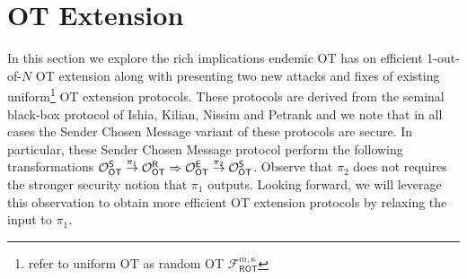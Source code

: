 

\newcommand{\rr}{\ensuremath{\boldsymbol{r}}}
\renewcommand{\tt}{\ensuremath{\boldsymbol{t}}}
\newcommand{\ww}{\ensuremath{\boldsymbol{w}}}
\newcommand{\cc}{\ensuremath{\boldsymbol{c}}}
\newcommand{\uu}{\ensuremath{\boldsymbol{u}}}
\newcommand{\qq}{\ensuremath{\boldsymbol{q}}}
\newcommand{\bb}{\ensuremath{\boldsymbol{b}}}
\newcommand{\vv}{\ensuremath{\boldsymbol{v}}}
\newcommand{\nc}{\ensuremath{{n_\mathcal{C}}}}
\newcommand{\kc}{\ensuremath{{k_\mathcal{C}}}}
\newcommand{\dc}{\ensuremath{{d_\mathcal{C}}}}

\section{OT Extension}


In this section we explore the rich implications endemic OT has on efficient 1-out-of-$N$ OT extension along with presenting two new attacks and fixes of existing uniform\footnote{\cite{KOS15, OOS16} refer to uniform OT as random OT $\mathcal{F}^{m,\kappa}_{\textsf{ROT}}$} OT extension protocols\cite{KOS15, OOS16}. These protocols are derived from the seminal black-box protocol of Ishia, Kilian, Nissim and Petrank\cite{IKNP03} and we note that in all cases the Sender Chosen Message variant of these protocols\cite{IKNP03, KOS15, OOS16} are secure. In particular, these Sender Chosen Message protocol perform the following transformations $\mathcal{O}_{\mathsf{OT}}^\mathsf{S}\overset{\pi_1}{\rightarrow} \mathcal{O}_{\mathsf{OT}}^\mathsf{R} \Rightarrow \mathcal{O}_{\mathsf{OT}}^\mathsf{E} \overset{\pi_2}{\rightarrow} \mathcal{O}_{\mathsf{OT}}^\mathsf{S}$. Observe that $\pi_2$ does not requires the stronger security notion that $\pi_1$ outputs. Looking forward, we will leverage this observation to obtain more efficient OT extension protocols by relaxing the input to $\pi_1$.






